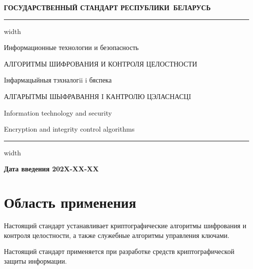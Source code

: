 \newpage
\setcounter{page}{1}
\pagestyle{headings}

\begin{center}
{\bfseries
ГОСУДАРСТВЕННЫЙ СТАНДАРТ РЕСПУБЛИКИ~БЕЛАРУСЬ
\vskip 2pt
\hrule width\textwidth

\vskip 9pt

Информационные технологии и безопасность

АЛГОРИТМЫ ШИФРОВАНИЯ И КОНТРОЛЯ ЦЕЛОСТНОСТИ

\vskip 9pt

Iнфармацыйныя тэхналогii i бяспека

АЛГАРЫТМЫ ШЫФРАВАННЯ I КАНТРОЛЮ ЦЭЛАСНАСЦI
} %

\vskip 9pt

Information technology and security

Encryption and integrity control algorithms

\vskip 4pt                
\hrule width \textwidth
\end{center}

\mbox{}\hfill{\bfseries Дата введения 202X-XX-XX}

\chapter{Область применения}

Настоящий стандарт устанавливает криптографические алгоритмы шифрования и 
контроля целостности, а также служебные алгоритмы управления ключами.

Настоящий стандарт применяется при разработке средств криптографической 
защиты информации. 

